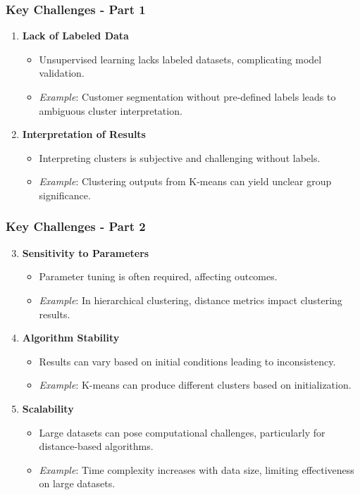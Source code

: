 \documentclass[aspectratio=169]{beamer}
\begin{document}
\begin{frame}[fragile]
    \frametitle{Key Challenges - Part 1}
    \begin{enumerate}
        \item \textbf{Lack of Labeled Data}
            \begin{itemize}
                \item Unsupervised learning lacks labeled datasets, complicating model validation.
                \item \textit{Example}: Customer segmentation without pre-defined labels leads to ambiguous cluster interpretation.
            \end{itemize}
        
        \item \textbf{Interpretation of Results}
            \begin{itemize}
                \item Interpreting clusters is subjective and challenging without labels.
                \item \textit{Example}: Clustering outputs from K-means can yield unclear group significance.
            \end{itemize}
    \end{enumerate}
\end{frame}

\begin{frame}[fragile]
    \frametitle{Key Challenges - Part 2}
    \begin{enumerate}
        \setcounter{enumi}{2} %
        \item \textbf{Sensitivity to Parameters}
            \begin{itemize}
                \item Parameter tuning is often required, affecting outcomes.
                \item \textit{Example}: In hierarchical clustering, distance metrics impact clustering results.
            \end{itemize}

        \item \textbf{Algorithm Stability}
            \begin{itemize}
                \item Results can vary based on initial conditions leading to inconsistency.
                \item \textit{Example}: K-means can produce different clusters based on initialization.
            \end{itemize}

        \item \textbf{Scalability}
            \begin{itemize}
                \item Large datasets can pose computational challenges, particularly for distance-based algorithms.
                \item \textit{Example}: Time complexity increases with data size, limiting effectiveness on large datasets.
            \end{itemize}
    \end{enumerate}
\end{frame}
\end{document}

